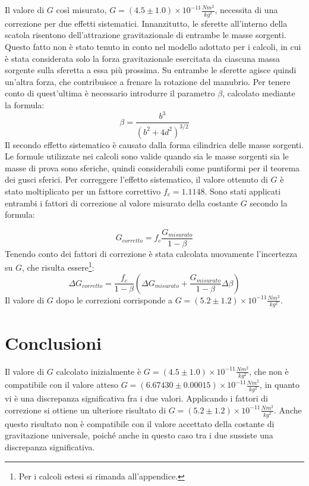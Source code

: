 \documentclass{article}
\begin{document}
Il valore di $G$ così misurato, $\displaystyle G=(4.5 \pm 1.0)\times10^{-11}\frac{Nm^{2}}{kg^{2}}$, necessita di una correzione per due effetti sistematici. Innanzitutto, le sferette all'interno della scatola risentono dell'attrazione gravitazionale di entrambe le masse sorgenti. Questo fatto non è stato tenuto in conto nel modello adottato per i calcoli, in cui è stata considerata solo la forza gravitazionale esercitata da ciascuna massa sorgente sulla sferetta a essa più prossima. Su entrambe le sferette agisce quindi un'altra forza, che contribuisce a frenare la rotazione del manubrio. Per tenere conto di quest'ultima è necessario introdurre il parametro $\beta$, calcolato mediante la formula:
\begin{equation}\label{eq:beta}
    \beta = \frac{b^{3}}{(b^{2}+4d^{2})^{3/2}}
\end{equation}
Il secondo effetto sistematico è causato dalla forma cilindrica delle masse sorgenti. Le formule utilizzate nei calcoli sono valide quando sia le masse sorgenti sia le masse di prova sono sferiche, quindi considerabili come puntiformi per il teorema dei gusci sferici\cite{focardi}. Per correggere l'effetto sistematico, il valore ottenuto di $G$ è stato moltiplicato per un fattore correttivo $f_c=1.1148$.
Sono stati applicati entrambi i fattori di correzione al valore misurato della costante $G$ secondo la formula:

\begin{equation}
    G_{corretto}=f_c\frac{G_{misurato}}{1-\beta}
\end{equation}
Tenendo conto dei fattori di correzione è stata calcolata nuovamente l'incertezza su $G$, che risulta essere\footnote{Per i calcoli estesi si rimanda all'appendice.}:
\begin{equation}
    \Delta G_{corretto} = \frac{f_c}{1 - \beta} \left( \Delta G_{misurato} + \frac{G_{misurato}}{1 - \beta} \Delta \beta \right)
\end{equation}
Il valore di $G$ dopo le correzioni corrisponde a $\displaystyle G=(5.2 \pm 1.2)\times10^{-11}\frac{Nm^{2}}{kg^{2}}$.

\section{Conclusioni}
Il valore di $G$ calcolato inizialmente è $\displaystyle G=(4.5 \pm 1.0)\times10^{-11}\frac{Nm^{2}}{kg^{2}}$, che non è compatibile con il valore atteso $\displaystyle G = (6.67430 \pm 0.00015)\times10^{-11}\frac{Nm^{2}}{kg^{2}}$, in quanto vi è una discrepanza significativa fra i due valori. Applicando i fattori di correzione si ottiene un ulteriore risultato di $\displaystyle G=(5.2 \pm 1.2)\times10^{-11}\frac{Nm^{2}}{kg^{2}}$.
Anche questo risultato non è compatibile con il valore accettato della costante di gravitazione universale, poiché anche in questo caso tra i due sussiste una discrepanza significativa.
\end{document}
